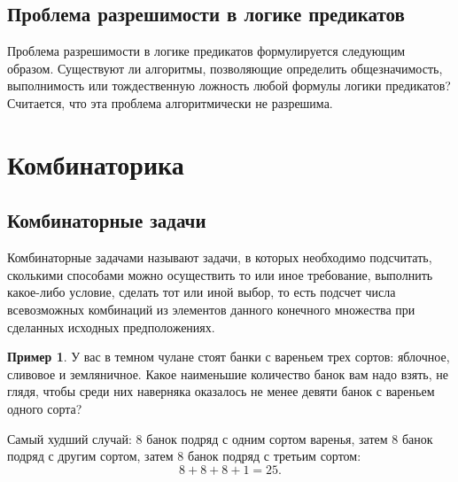 \documentclass[a5paper, 11pt]{extarticle}
\theoremstyle{definition}
\newtheorem{example}{Пример}[subsection]
\theoremstyle{definition}
\theoremstyle{definition}
\numberwithin{figure}{section}
\numberwithin{table}{section}
\begin{document}
\subsection{Проблема разрешимости в логике предикатов}

Проблема разрешимости в логике предикатов формулируется следующим образом. Существуют ли алгоритмы, позволяющие определить общезначимость, выполнимость или тождественную ложность любой формулы логики предикатов? Считается, что эта проблема алгоритмически не разрешима.

\section{Комбинаторика}

\subsection{Комбинаторные задачи}

Комбинаторные задачами называют задачи, в которых необходимо подсчитать, сколькими способами можно осуществить то или иное требование, выполнить какое-либо условие, сделать тот или иной выбор, то есть подсчет числа всевозможных комбинаций из элементов данного конечного множества при сделанных исходных предположениях.

\begin{example}
    У вас в темном чулане стоят банки с вареньем трех сортов: яблочное, сливовое и земляничное. Какое наименьшие количество банок вам надо взять, не глядя, чтобы среди них наверняка оказалось не менее девяти банок с вареньем одного сорта?

    Самый худший случай: \(8\) банок подряд с одним сортом варенья, затем \(8\) банок подряд с другим сортом, затем \(8\) банок подряд с третьим сортом:
    \[
        8 + 8 + 8 + 1 = 25.
    \]
\end{example}
\end{document}
